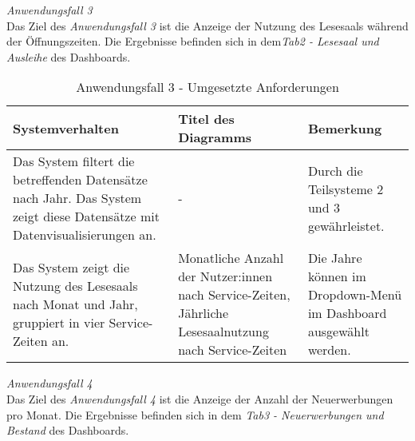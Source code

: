     \endgroup

\clearpage
\noindent
\textit{Anwendungsfall 3}\\
Das Ziel des \textit{Anwendungsfall 3} ist die Anzeige der Nutzung des Lesesaals während der Öffnungszeiten.
Die Ergebnisse befinden sich in dem\textit{Tab2 - Lesesaal und Ausleihe} des Dashboards.

\begingroup
    \setlength{\tabcolsep}{12pt} %
    \renewcommand{\arraystretch}{1.5}
    \begin{table}[h]
        \Large
        \centering
        \begin{adjustbox}{max width=\textwidth}
        \begin{tabular}{p{}p{}p{}}
           \toprule
           Systemverhalten        &Titel des Diagramms&Bemerkung\\
           \midrule
           Das System filtert die betreffenden Datensätze nach Jahr. Das System zeigt diese Datensätze mit Datenvisualisierungen an.&-&Durch die Teilsysteme 2  und 3 gewährleistet.\\
           Das System zeigt die Nutzung des Lesesaals nach Monat und Jahr, gruppiert in vier Service-Zeiten an.&Monatliche Anzahl der Nutzer:innen nach Service-Zeiten, Jährliche Lesesaalnutzung nach Service-Zeiten& Die Jahre können im Dropdown-Menü im Dashboard ausgewählt werden.\\

        \bottomrule
        \end{tabular}
        \end{adjustbox}
        \caption{%
            Anwendungsfall 3 - Umgesetzte Anforderungen
        }
        \label{tab:Anwendungsfall 3 - Umgesetzte Anforderungen}
        \end{table}
\endgroup

\clearpage
\noindent
\textit{Anwendungsfall 4}\\
Das Ziel des \textit{Anwendungsfall 4} ist die Anzeige der Anzahl der Neuerwerbungen pro Monat.
Die Ergebnisse befinden sich in dem \textit{Tab3 - Neuerwerbungen und Bestand} des Dashboards.

